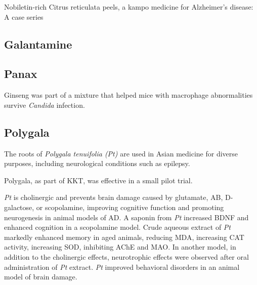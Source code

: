 Nobiletin-rich Citrus reticulata peels,
a kampo medicine for Alzheimer's disease: A case series
\cite{seki2013nobiletin}





\subsection{Galantamine}












\subsection{Panax}

Ginseng was part of a mixture that
helped mice with macrophage abnormalities
survive \textit{Candida} infection.
\cite{akagawa1996protection}







\subsection{Polygala}

The roots of \textit{Polygala tenuifolia (Pt)} are used in Asian medicine
for diverse purposes, including neurological conditions such as epilepsy.

Polygala, as part of KKT, was effective in a small pilot trial.
\cite{arai2015effectiveness}



\textit{Pt} is cholinergic and prevents brain
damage caused by glutamate, AB, D-galactose, or scopolamine,
improving cognitive function and promoting neurogenesis
in animal models of AD.
\cite{park2002novel,
zhang2006effect,
sun2007effect,
zeng2009effect,
wen2010study,
shi2011effects}
A saponin from \textit{Pt}
increased BDNF and enhanced cognition
in a scopolamine model.
\cite{xue2009polygalasaponin}
Crude aqueous extract of \textit{Pt} markedly
enhanced memory in aged animals,
reducing MDA, increasing CAT activity,
increasing SOD, inhibiting AChE and MAO.
\cite{li2014memory}
In another model, in addition to the cholinergic effects,
neurotrophic effects were observed
after oral administration of \textit{Pt} extract.
\cite{yabe1997enhancements}
\textit{Pt} improved behavioral disorders in an animal model
of brain damage.
\cite{chen2004effect}

